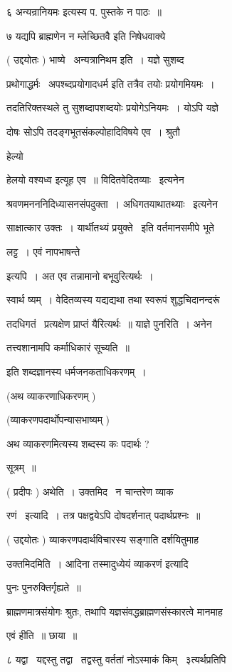 \documentclass[11pt, openany]{book}
\begin{document}
६ {\qt अन्यन्रानियमः} इत्यस्य प. पुस्तके न पाठः~॥ 

७ यद्यपि {\qt ब्राह्मणेन न म्लेच्छितवै इति निषेधवाक्ये}





( उद्दयोतः ) भाष्ये \textendash\ अन्यत्रानिथम इति~। {\qt यज्ञे सुशब्द} \textendash\ 

प्रथोगाद्धर्मः \textendash\ अपश्ब्दप्रयोगादधर्म इति तत्रैव तयोः प्रयोगमियमः~। 

तदतिरिक्तस्थले तु सुशब्दापशब्दयोः प्रयोगेऽनियमः~। योऽपि यज्ञे 

दोषः सोऽपि तदङ्गभूतसंकल्पोहादिविषये एव~। श्रुतौ {\qt हेल्यो 

हेलयो वश्यध्व इत्यूह एव~॥ विदितवेदितव्याः \textendash\ इत्यनेन 

श्रवणमनननिदिध्यासनसंपदुक्ता~। अधिगतयाथातथ्याः \textendash\ इत्यनेन 

साक्षात्कार उक्तः~। यार्थीतथ्यं प्रयुक्ते \textendash\ इति वर्तमानसमीपे भूते 

लट्ट~। एवं नापभाषन्ते} इत्यपि~। अत एव तन्नामानो बभूवुरित्यर्थः~। 

स्वार्थ ष्यम्~। वेदितव्यस्य यद्यद्यथा तथा स्वरूपं शुद्धचिदानन्दरूं 

तदधिगतं \textendash\ प्रत्यक्षेण प्राप्तं यैरित्यर्थः~॥ याज्ञे पुनरिति~। अनेन 

तत्त्वशानामपि कर्माधिकारं सूच्यति~॥ 

इति शब्दज्ञानस्य धर्मजनकताधिकरणम्~। 

(अथ व्याकरणाधिकरणम् ) 

(व्याकरणपदार्थोपन्यासभाष्यम् ) 

अथ व्याकरणमित्यस्य शब्दस्य कः पदार्थः ? 

सूत्रम्~॥ 

( प्रदीपः ) अथेति~। उक्तमिद \textendash\ न चान्तरेण व्याक \textendash\ 

रणं \textendash\ इत्यादि~। तत्र पक्षद्वयेऽपि दोषदर्शनात् पदार्थप्रश्नः~॥ 

( उद्दयोतः ) व्याकरणपदार्थविचारस्य सङ्गाति दर्शयितुमाह \textendash\ 

उक्तमिदमिति~। आदिना {\qt तस्मादुध्येयं व्याकरणं} इत्यादि 

पुनः पुनरुक्तिर्गृह्यते~॥ 

ब्राह्मणमात्रसंयोगः श्रुतः, तथापि यज्ञसंवद्धब्राह्मणसंस्कारत्वे
मानमाह \textendash\ 

एवं हीति~॥ छाया~॥ 

८ यद्वा \textendash\ यद्दस्तु तद्वा \textendash\ तद्वस्तु वर्ततां नोऽस्माकं किम् \textendash\ ३त्यर्थप्रतिपि \textendash\ 
\end{document}
